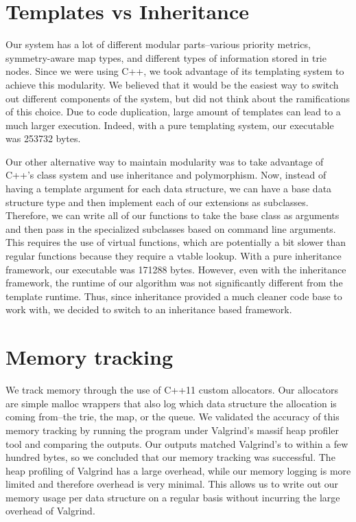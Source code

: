 \section{Templates vs Inheritance}
Our system has a lot of different modular parts--various priority metrics, symmetry-aware map types, and different types of information stored in trie nodes.
Since we were using C++, we took advantage of its templating system to achieve this modularity.
We believed that it would be the easiest way to switch out different components of the system, but did not think about the ramifications of this choice.
Due to code duplication, large amount of templates can lead to a much larger execution.
Indeed, with a pure templating system, our executable was 253732 bytes.

Our other alternative way to maintain modularity was to take advantage of C++'s class system and use inheritance and polymorphism.
Now, instead of having a template argument for each data structure, we can have a base data structure type and then implement each of our extensions as subclasses.
Therefore, we can write all of our functions to take the base class as arguments and then pass in the specialized subclasses based on command line arguments.
This requires the use of virtual functions, which are potentially a bit slower than regular functions because they require a vtable lookup.
With a pure inheritance framework, our executable was 171288 bytes.
However, even with the inheritance framework, the runtime of our algorithm was not significantly different from the template runtime.
Thus, since inheritance provided a much cleaner code base to work with, we decided to switch to an inheritance based framework.

\section{Memory tracking}
We track memory through the use of C++11 custom allocators.
Our allocators are simple malloc wrappers that also log which data structure the allocation is coming from--the trie, the map, or the queue.
We validated the accuracy of this memory tracking by running the program under Valgrind's massif heap profiler tool and comparing the outputs.
Our outputs matched Valgrind's to within a few hundred bytes, so we concluded that our memory tracking was successful.
The heap profiling of Valgrind has a large overhead, while our memory logging is more limited and therefore overhead is very minimal.
This allows us to write out our memory usage per data structure on a regular basis without incurring the large overhead of Valgrind.